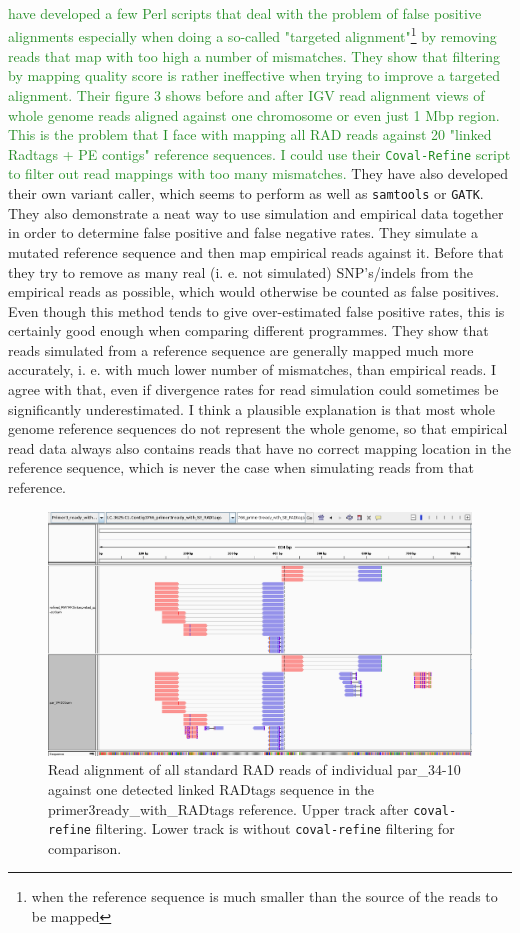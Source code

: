 \documentclass{article}\usepackage[]{graphicx}\usepackage[]{color}
\newcommand{\roger}[1]{ \textcolor[named]{ForestGreen}{#1} }
\begin{document}
\roger{\cite{Kosugi2013} have developed a few Perl scripts that deal with the problem of false positive alignments especially when doing a so-called "targeted alignment"\footnote{when the reference sequence is much smaller than the source of the reads to be mapped} by removing reads that map with too high a number of mismatches. They show that filtering by mapping quality score is rather ineffective when trying to improve a targeted alignment. Their figure 3 shows before and after IGV read alignment views of whole genome reads aligned against one chromosome or even just 1 Mbp region. This is the problem that I face with mapping all RAD reads against 20 "linked Radtags + PE contigs" reference sequences. I could use their \texttt{Coval-Refine} script to filter out read mappings with too many mismatches.}  
They have also developed their own variant caller, which seems to perform as well as \texttt{samtools} or \texttt{GATK}. They also demonstrate a neat way to use simulation and empirical data together in order to determine false positive and false negative rates. They simulate a mutated reference sequence and then map empirical reads against it. Before that they try to remove as many real (i. e. not simulated) SNP's/indels from the empirical reads as possible, which would otherwise be counted as false positives. Even though this method tends to give over-estimated false positive rates, this is certainly good enough when comparing different programmes. They show that reads simulated from a reference sequence are generally mapped much more accurately, i. e. with much lower number of mismatches, than empirical reads. I agree with that, even if divergence rates for read simulation could sometimes be significantly underestimated. I think a plausible explanation is that most whole genome reference sequences do not represent the whole genome, so that empirical read data always also contains reads that have no correct mapping location in the reference sequence, which is never the case when simulating reads from that reference.

\begin{figure}
\centering
\includegraphics[width=\textwidth]{./figure/stampy_par_34-10_vs_primer3ready_after_coval-refine_igv}
\caption{Read alignment of all standard RAD reads of individual par\_34-10 against one detected linked RADtags sequence in the primer3ready\_with\_RADtags reference. Upper track after \texttt{coval-refine} filtering. Lower track is without \texttt{coval-refine} filtering for comparison.}
\label{coval-refine}
\end{figure}
\end{document}
